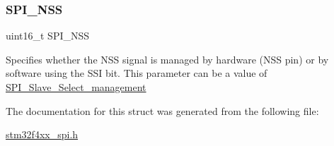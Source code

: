 \subsubsection{\texorpdfstring{S\+P\+I\+\_\+\+N\+SS}{SPI\_NSS}}
{\footnotesize\ttfamily uint16\+\_\+t S\+P\+I\+\_\+\+N\+SS}

Specifies whether the N\+SS signal is managed by hardware (N\+SS pin) or by software using the S\+SI bit. This parameter can be a value of \mbox{\hyperlink{group___s_p_i___slave___select__management}{S\+P\+I\+\_\+\+Slave\+\_\+\+Select\+\_\+management}} 

The documentation for this struct was generated from the following file\+:\begin{DoxyCompactItemize}
\item 
\mbox{\hyperlink{stm32f4xx__spi_8h}{stm32f4xx\+\_\+spi.\+h}}\end{DoxyCompactItemize}
